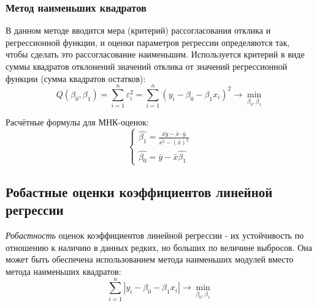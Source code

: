 \documentclass[12pt,a4paper]{article}
\begin{document}
\subsubsection{Метод наименьших квадратов}
В данном методе вводится мера (критерий) рассогласования отклика и регрессионной функции, и оценки параметров регрессии определяются так, чтобы сделать это рассогласование наименьшим. Используется критерий в виде суммы квадратов отклонений значений отклика от значений регрессионной функции (сумма квадратов остатков):
\begin{equation}
    Q(\beta_0,\beta_1)=\sum_{i=1}^n{\varepsilon_i^2}=\sum_{i=1}^n{(y_i-\beta_0-\beta_1x_i)^2}\rightarrow\min_{\beta_0,\beta_1}
\end{equation}

Расчётные формулы для МНК-оценок:
\begin{equation}
    \left\{
    \begin{array}{ll}
        \hat{\beta_1}=\frac{\bar{xy}-\bar{x}\cdot\bar{y}}{\bar{x^2}-(\bar{x})^2}\\
        \hat{\beta_0}=\bar{y}-\bar{x}\hat{\beta_1}
    \end{array}
    \right.
\end{equation}

\subsection{Робастные оценки коэффициентов линейной регрессии}
\textit{Робастность} оценок коэффициентов линейной регрессии - их устойчивость по отношению к наличию в данных редких, но больших по величине выбросов. Она может быть обеспечена использованием метода наименьших модулей вместо метода наименьших квадратов:
\begin{equation}
    \sum_{i=1}^n{|y_i-\beta_0-\beta_1x_i|}\rightarrow\min_{\beta_0,\beta_1}
\end{equation}
\end{document}
